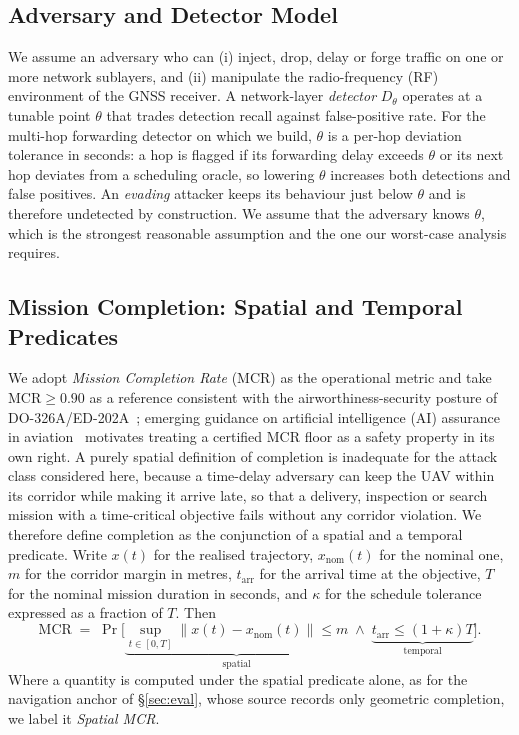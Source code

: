 \documentclass[conference,letterpaper,10pt]{IEEEtran}   %
\newcommand{\Norm}[1]{\left\lVert #1\right\rVert}
\newcommand{\MCR}{\mathrm{MCR}}
\begin{document}
\subsection{Adversary and Detector Model}
\label{sec:adversary}
We assume an adversary who can (i) inject, drop, delay or forge traffic on one
or more network sublayers, and (ii) manipulate the radio-frequency (RF)
environment of the GNSS
receiver. A network-layer \emph{detector} $D_\theta$ operates at a tunable
point $\theta$ that trades detection recall against false-positive rate. For
the multi-hop forwarding detector on which we build, $\theta$ is a per-hop
deviation tolerance in seconds: a hop is flagged if its forwarding delay
exceeds $\theta$ or its next hop deviates from a scheduling oracle, so lowering
$\theta$ increases both detections and false positives. An \emph{evading}
attacker keeps its behaviour just below $\theta$ and is therefore undetected by
construction. We assume that the adversary knows $\theta$, which is the
strongest reasonable assumption and the one our worst-case analysis requires.

\subsection{Mission Completion: Spatial and Temporal Predicates}
\label{sec:mcr}
We adopt \emph{Mission Completion Rate} (MCR) as the operational metric and
take $\MCR\ge0.90$ as a reference consistent with the airworthiness-security
posture of DO-326A/ED-202A~\cite{do326a}; emerging guidance on artificial
intelligence (AI) assurance in aviation~\cite{ed324} motivates treating a
certified MCR floor as a safety property in its own right. A purely spatial
definition of completion is inadequate for the attack class considered here,
because a time-delay adversary can keep the UAV within its corridor while
making it arrive late, so that a delivery,
inspection or search mission with a time-critical objective fails without any
corridor violation. We therefore define completion as the conjunction of a
spatial and a temporal predicate. Write $x(t)$ for the realised trajectory,
$x_{\mathrm{nom}}(t)$ for the nominal one, $m$ for the corridor margin in
metres, $t_{\mathrm{arr}}$ for the arrival time at the objective, $T$ for the
nominal mission duration in seconds, and $\kappa$ for the schedule tolerance
expressed as a fraction of $T$. Then
\begin{equation}
\label{eq:mcr}
\MCR \;=\; \Pr\Big[\underbrace{\sup_{t\in[0,T]}\Norm{x(t)-x_{\mathrm{nom}}(t)}\le m}_{\text{spatial}}
\;\wedge\;
\underbrace{t_{\mathrm{arr}}\le(1+\kappa)T}_{\text{temporal}}\Big].
\end{equation}
Where a quantity is computed under the spatial predicate alone, as for the
navigation anchor of \S\ref{sec:eval}, whose source records only geometric
completion, we label it \emph{Spatial MCR}.
\end{document}
